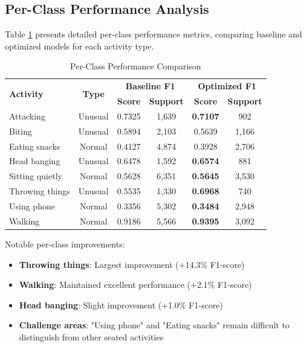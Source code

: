 \documentclass[a4paper,11pt]{article}
\begin{document}
\subsection{Per-Class Performance Analysis}

Table \ref{tab:class_performance} presents detailed per-class performance metrics, comparing baseline and optimized models for each activity type.

\begin{table}[H]
\centering
\caption{Per-Class Performance Comparison}
\label{tab:class_performance}
\small
\begin{tabular}{lccccc}
\toprule
\multirow{2}{*}{\textbf{Activity}} & \multirow{2}{*}{\textbf{Type}} & \multicolumn{2}{c}{\textbf{Baseline F1}} & \multicolumn{2}{c}{\textbf{Optimized F1}} \\
\cmidrule(lr){3-4} \cmidrule(lr){5-6}
& & \textbf{Score} & \textbf{Support} & \textbf{Score} & \textbf{Support} \\
\midrule
Attacking & Unusual & 0.7325 & 1,639 & \textcolor{improvement}{\textbf{0.7107}} & 902 \\
Biting & Unusual & 0.5894 & 2,103 & 0.5639 & 1,166 \\
Eating snacks & Normal & 0.4127 & 4,874 & 0.3928 & 2,706 \\
Head banging & Unusual & 0.6478 & 1,592 & \textcolor{improvement}{\textbf{0.6574}} & 881 \\
Sitting quietly & Normal & 0.5628 & 6,351 & \textcolor{improvement}{\textbf{0.5645}} & 3,530 \\
Throwing things & Unusual & 0.5535 & 1,330 & \textcolor{improvement}{\textbf{0.6968}} & 740 \\
Using phone & Normal & 0.3356 & 5,302 & \textcolor{improvement}{\textbf{0.3484}} & 2,948 \\
Walking & Normal & 0.9186 & 5,566 & \textcolor{improvement}{\textbf{0.9395}} & 3,092 \\
\bottomrule
\end{tabular}
\end{table}

Notable per-class improvements:
\begin{itemize}
\item \textcolor{improvement}{\textbf{Throwing things}}: Largest improvement (+14.3\% F1-score)
\item \textcolor{improvement}{\textbf{Walking}}: Maintained excellent performance (+2.1\% F1-score)
\item \textcolor{improvement}{\textbf{Head banging}}: Slight improvement (+1.0\% F1-score)
\item \textbf{Challenge areas}: "Using phone" and "Eating snacks" remain difficult to distinguish from other seated activities
\end{itemize}
\end{document}
